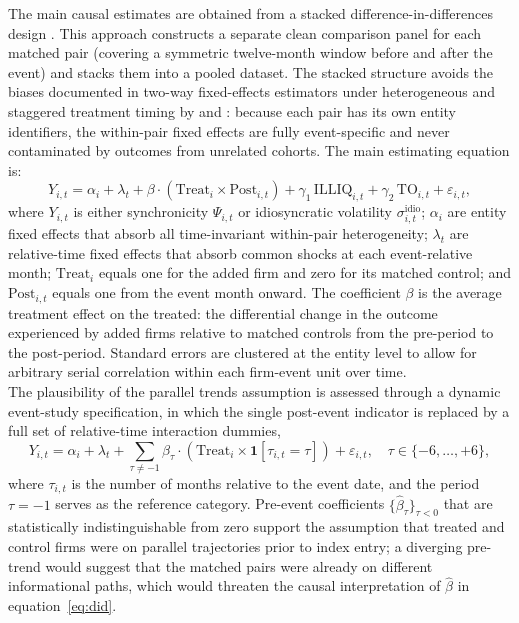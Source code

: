 \documentclass[12pt, a4paper]{article}
\begin{document}
The main causal estimates are obtained from a stacked difference-in-differences design \citep{cengiz2019effect, baker2022how}. This approach constructs a separate clean comparison panel for each matched pair (covering a symmetric twelve-month window before and after the event) and stacks them into a pooled dataset. The stacked structure avoids the biases documented in two-way fixed-effects estimators under heterogeneous and staggered treatment timing by \citet{callaway2021difference} and \citet{goodman2021difference}: because each pair has its own entity identifiers, the within-pair fixed effects are fully event-specific and never contaminated by outcomes from unrelated cohorts. The main estimating equation is:
\begin{equation}
    Y_{i,t} = \alpha_i + \lambda_t + \beta \cdot (\text{Treat}_{i} \times \text{Post}_{i,t}) + \gamma_1 \,\text{ILLIQ}_{i,t} + \gamma_2 \,\text{TO}_{i,t} + \varepsilon_{i,t}, \label{eq:did}
\end{equation}
where $Y_{i,t}$ is either synchronicity $\Psi_{i,t}$ or idiosyncratic volatility $\sigma^{\text{idio}}_{i,t}$; $\alpha_i$ are entity fixed effects that absorb all time-invariant within-pair heterogeneity; $\lambda_t$ are relative-time fixed effects that absorb common shocks at each event-relative month; $\text{Treat}_i$ equals one for the added firm and zero for its matched control; and $\text{Post}_{i,t}$ equals one from the event month onward. The coefficient $\beta$ is the average treatment effect on the treated: the differential change in the outcome experienced by added firms relative to matched controls from the pre-period to the post-period. Standard errors are clustered at the entity level to allow for arbitrary serial correlation within each firm-event unit over time.\\

The plausibility of the parallel trends assumption is assessed through a dynamic event-study specification, in which the single post-event indicator is replaced by a full set of relative-time interaction dummies,
\begin{equation}
    Y_{i,t} = \alpha_i + \lambda_t + \sum_{\tau \neq -1} \beta_\tau \cdot \left(\text{Treat}_{i} \times \mathbf{1}[\tau_{i,t} = \tau]\right) + \varepsilon_{i,t}, \quad \tau \in \{-6, \ldots, +6\}, \label{eq:event_study}
\end{equation}
where $\tau_{i,t}$ is the number of months relative to the event date, and the period $\tau = -1$ serves as the reference category. Pre-event coefficients $\{\hat{\beta}_\tau\}_{\tau < 0}$ that are statistically indistinguishable from zero support the assumption that treated and control firms were on parallel trajectories prior to index entry; a diverging pre-trend would suggest that the matched pairs were already on different informational paths, which would threaten the causal interpretation of $\hat{\beta}$ in equation~\eqref{eq:did}.\\
\end{document}
